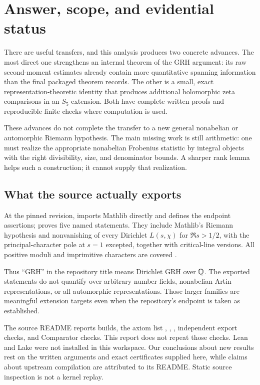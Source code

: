 \section{Answer, scope, and evidential status}

There are useful transfers, and this analysis produces two concrete advances.
The most direct one strengthens an internal theorem of the GRH argument:
its raw second-moment estimates already contain more quantitative spanning
information than the final packaged theorem records. The other is a small,
exact representation-theoretic identity that produces additional holomorphic
zeta comparisons in an $S_5$ extension. Both have complete written proofs and
reproducible finite checks where computation is used.

These advances do not complete the transfer to a new general nonabelian or
automorphic Riemann hypothesis. The main missing work is still arithmetic:
one must realize the appropriate nonabelian Frobenius statistic by integral
objects with the right divisibility, size, and denominator bounds. A sharper
rank lemma helps such a construction; it cannot supply that realization.

\subsection{What the source actually exports}

At the pinned revision,
 imports Mathlib directly and
defines the endpoint assertions;  proves
five named statements. They include Mathlib's Riemann hypothesis and
nonvanishing of every Dirichlet $L(s,\chi)$ for $\Re s>1/2$, with the
principal-character pole at $s=1$ excepted, together with critical-line
versions. All positive moduli and imprimitive characters are covered
\cite{repo,statements}.

Thus ``GRH'' in the repository title means Dirichlet GRH over $\mathbb Q$.
The exported statements do not quantify over arbitrary number fields,
nonabelian Artin representations, or all automorphic representations.
Those larger families are meaningful extension targets even when the
repository's endpoint is taken as established.

The source README reports builds, the axiom list
, , , independent export
checks, and Comparator checks. This report does not repeat those checks.
Lean and Lake were not installed in this workspace. Our conclusions about
new results rest on the written arguments and exact certificates supplied
here, while claims about upstream compilation are attributed to its README.
Static source inspection is not a kernel replay.

